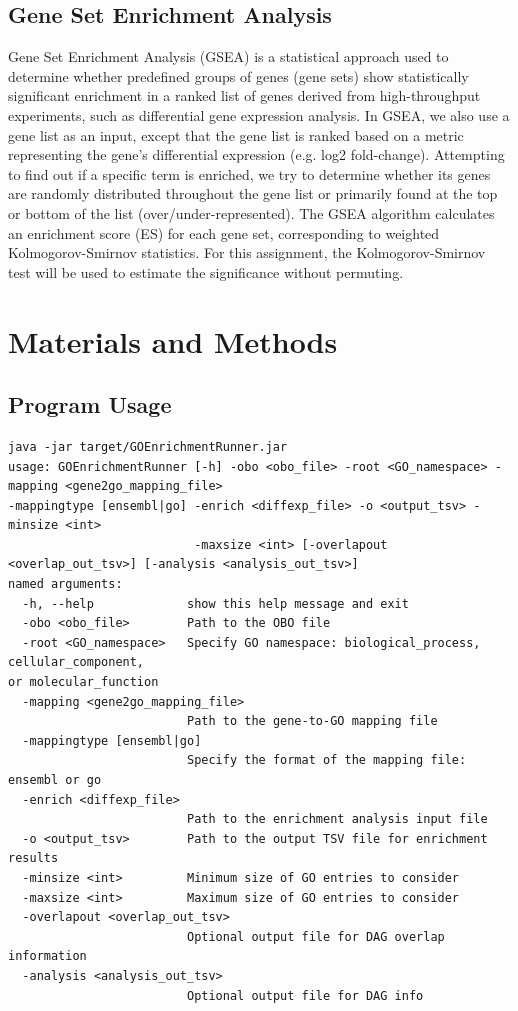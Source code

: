 \documentclass{article}
\begin{document}
    \subsection{Gene Set Enrichment Analysis}\label{subsec:gene-set-enrichment-analysis}
    Gene Set Enrichment Analysis (GSEA) is a statistical approach used to determine whether predefined groups of genes (gene sets) show statistically significant enrichment in a ranked list of genes derived from high-throughput experiments, such as differential gene expression analysis. In GSEA, we also use a gene list as an input, except that the gene list is ranked based on a metric representing the gene's differential expression (e.g. log2 fold-change). Attempting to find out if a specific term is enriched, we try to determine whether its genes are randomly distributed throughout the gene list or primarily found at the top or bottom of the list (over/under-represented). The GSEA algorithm calculates an enrichment score (ES) for each gene set, corresponding to weighted Kolmogorov-Smirnov statistics\cite{subramanian}. For this assignment, the Kolmogorov-Smirnov test will be used to estimate the significance without permuting.


    \section{Materials and Methods}\label{sec:materials-and-methods}

    \subsection{Program Usage}\label{subsec:program-usage}
    \begin{verbatim}
java -jar target/GOEnrichmentRunner.jar
usage: GOEnrichmentRunner [-h] -obo <obo_file> -root <GO_namespace> -mapping <gene2go_mapping_file>
-mappingtype [ensembl|go] -enrich <diffexp_file> -o <output_tsv> -minsize <int>
                          -maxsize <int> [-overlapout <overlap_out_tsv>] [-analysis <analysis_out_tsv>]
named arguments:
  -h, --help             show this help message and exit
  -obo <obo_file>        Path to the OBO file
  -root <GO_namespace>   Specify GO namespace: biological_process, cellular_component,
or molecular_function
  -mapping <gene2go_mapping_file>
                         Path to the gene-to-GO mapping file
  -mappingtype [ensembl|go]
                         Specify the format of the mapping file: ensembl or go
  -enrich <diffexp_file>
                         Path to the enrichment analysis input file
  -o <output_tsv>        Path to the output TSV file for enrichment results
  -minsize <int>         Minimum size of GO entries to consider
  -maxsize <int>         Maximum size of GO entries to consider
  -overlapout <overlap_out_tsv>
                         Optional output file for DAG overlap information
  -analysis <analysis_out_tsv>
                         Optional output file for DAG info
    \end{verbatim}
\end{document}
